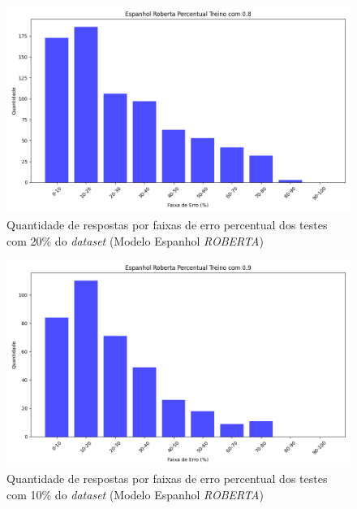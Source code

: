 \begin{figure}[h!]
\includegraphics[width=\textwidth]{img/grafsEsp/Espanhol Roberta Percentual Treino com 0.8_quantidade.png}
\caption{Quantidade de respostas por faixas de erro percentual dos testes com 20\% do \textit{dataset} (Modelo Espanhol \textit{ROBERTA})}\label{figure:14}
\end{figure}

\begin{figure}[h!]
\includegraphics[width=\textwidth]{img/grafsEsp/Espanhol Roberta Percentual Treino com 0.9_quantidade.png}
\caption{Quantidade de respostas por faixas de erro percentual dos testes com 10\% do \textit{dataset} (Modelo Espanhol \textit{ROBERTA})}\label{figure:15}
\end{figure}